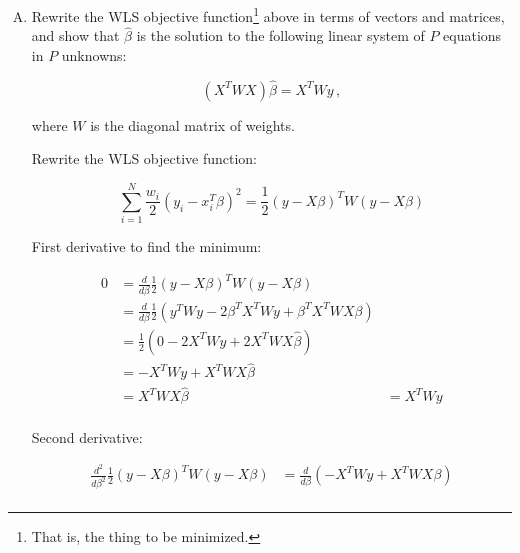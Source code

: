 \documentclass{article}
\begin{document}
\begin{enumerate}[(A)]







\item Rewrite the WLS objective function\footnote{That is, the thing to be minimized.} above in terms of vectors and matrices, and show that $\hat \beta$ is the solution to the following linear system of $P$ equations in $P$ unknowns:



$$

(X^T W X) \hat \beta = X^T W y \, ,

$$



where $W$ is the diagonal matrix of weights.



\color{blue}

Rewrite the WLS objective function:

$$ \sum_{i=1}^N \frac{w_i}{2}(y_i - x_i^T \beta)^2  = \frac{1}{2} (y- X\beta)^T W  (y- X\beta) $$

First derivative to find the minimum:

\begin{align*}

0 & = \frac{d}{d\beta} \frac{1}{2} (y- X\beta)^T W  (y- X\beta) \\

		& = \frac{d}{d\beta} \frac{1}{2}  \left( y^T Wy - 2 \beta^TX^T Wy + \beta^TX^T W X\beta \right) \\

		& =  \frac{1}{2} \left( 0 - 2 X^T Wy + 2 X^T W X\hat\beta  \right) \\

		& =- X^T Wy +  X^T W X\hat\beta   \\

		& =X^T W X\hat\beta & =X^T Wy     \\

\end{align*}



Second derivative: 

\begin{align*}

		 \frac{d^2}{d\beta^2} \frac{1}{2} (y- X\beta)^T W  (y- X\beta) 

		& = \frac{d}{d\beta} \left( -  X^T Wy +  X^T W X\beta  \right)\\


\end{align*}
\end{enumerate}
\end{document}
